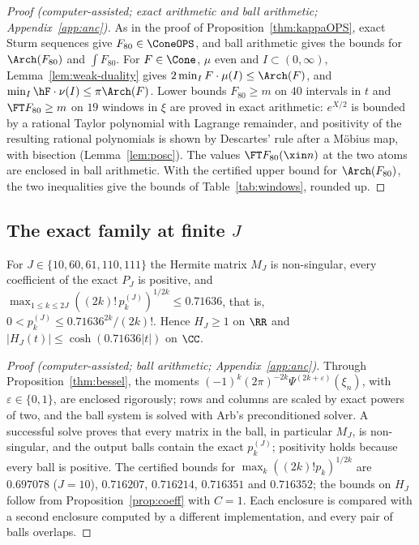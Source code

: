 \begin{proof}[Proof (computer-assisted; exact arithmetic and ball arithmetic; Appendix~\ref{app:anc})]
As in the proof of Proposition~\ref{thm:kappaOPS}, exact Sturm sequences give $F_{80}\in\ConeOPS$, and ball arithmetic gives the bounds for
$\Arch(F_{80})$ and $\int F_{80}$. For
$F\in\Cone$, $\mu$ even and $I\subset(0,\infty)$, Lemma~\ref{lem:weak-duality} gives $2\min_IF\cdot\mu(I)\le\Arch(F)$, and
$\min_I\hF\cdot\nu(I)\le\pi\Arch(F)$. Lower bounds $F_{80}\ge m$ on $40$ intervals in $t$ and $\FT F_{80}\ge m$ on $19$ windows in $\xi$ are
proved in exact arithmetic: $e^{X/2}$ is bounded by a rational Taylor polynomial with Lagrange remainder, and positivity of the resulting
rational polynomials is shown by Descartes' rule after a M\"obius map, with bisection (Lemma~\ref{lem:posc}). The values $\FT F_{80}(\xin n)$
at the two atoms are enclosed in ball arithmetic. With the certified upper bound for $\Arch(F_{80})$, the two inequalities give the
bounds of Table~\ref{tab:windows}, rounded up.
\end{proof}

\subsection{The exact family at finite \texorpdfstring{$J$}{J}}

\begin{proposition}\label{thm:finiteJ}
For $J\in\{10,60,61,110,111\}$ the Hermite matrix $M_J$ is non-singular, every coefficient of the exact $P_J$ is positive, and
$\max_{1\le k\le2J}((2k)!\,p_k^{(J)})^{1/2k}\le0.71636$, that is, $0<p_k^{(J)}\le0.71636^{2k}/(2k)!$. Hence $H_J\ge1$ on $\RR$ and
$\lvert H_J(t)\rvert\le\cosh(0.71636\lvert t\rvert)$ on $\CC$.
\end{proposition}

\begin{proof}[Proof (computer-assisted; ball arithmetic; Appendix~\ref{app:anc})]
Through Proposition~\ref{thm:bessel}, the moments $(-1)^k(2\pi)^{-2k}\Psi^{(2k+\varepsilon)}(\xi_n)$, with $\varepsilon\in\{0,1\}$, are
enclosed rigorously; rows and columns are scaled by exact powers of two, and the ball system is solved with Arb's preconditioned
solver. A successful solve proves that every matrix in the ball, in particular $M_J$, is non-singular, and the output balls contain the
exact $p^{(J)}_k$; positivity holds because every ball is positive. The certified bounds for $\max_k((2k)!p_k)^{1/2k}$ are $0.697078$
($J=10$), $0.716207$, $0.716214$, $0.716351$ and $0.716352$; the bounds on $H_J$ follow from Proposition~\ref{prop:coeff} with $C=1$.
Each enclosure is compared with a second enclosure computed by a different implementation, and every pair of balls overlaps.
\end{proof}

